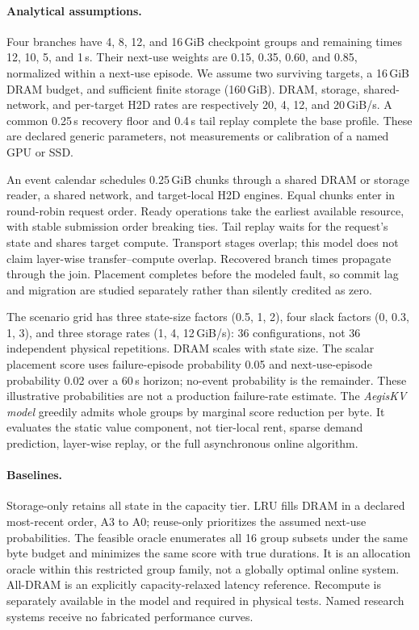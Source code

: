 \documentclass[sigplan,10pt,anonymous,nonacm]{acmart}
\begin{document}
\paragraph{Analytical assumptions.}
Four branches have 4, 8, 12, and 16\,GiB checkpoint groups and remaining
times 12, 10, 5, and 1\,s. Their next-use weights are 0.15, 0.35, 0.60,
and 0.85, normalized within a next-use episode. We assume two surviving
targets, a 16\,GiB DRAM budget, and sufficient finite storage (160\,GiB).
DRAM, storage, shared-network, and per-target H2D rates are respectively
20, 4, 12, and 20\,GiB/s. A common 0.25\,s recovery floor and 0.4\,s tail
replay complete the base profile. These are declared generic parameters,
not measurements or calibration of a named GPU or SSD.

An event calendar schedules 0.25\,GiB chunks through a shared DRAM or
storage reader, a shared network, and target-local H2D engines. Equal
chunks enter in round-robin request order. Ready operations take the
earliest available resource, with stable submission order breaking ties.
Tail replay waits for the request's state and shares target compute.
Transport stages overlap; this model does not claim layer-wise
transfer--compute overlap. Recovered branch times propagate through the
join. Placement completes before the modeled fault, so commit lag and
migration are studied separately rather than silently credited as zero.

The scenario grid has three state-size factors (0.5, 1, 2), four slack
factors (0, 0.3, 1, 3), and three storage rates (1, 4, 12\,GiB/s): 36
configurations, not 36 independent physical repetitions. DRAM scales with
state size. The scalar placement score uses failure-episode probability
0.05 and next-use-episode probability 0.02 over a 60\,s horizon; no-event
probability is the remainder. These illustrative probabilities are not a
production failure-rate estimate. The \emph{AegisKV model} greedily admits
whole groups by marginal score reduction per byte. It evaluates the
static value component, not tier-local rent, sparse demand prediction,
layer-wise replay, or the full asynchronous online algorithm.

\paragraph{Baselines.}
Storage-only retains all state in the capacity tier. LRU fills DRAM in
a declared most-recent order, A3 to A0; reuse-only prioritizes the assumed
next-use probabilities. The feasible oracle enumerates all 16 group
subsets under the same byte budget and minimizes the same score with true
durations. It is an allocation oracle within this restricted group family,
not a globally optimal online system. All-DRAM is an explicitly
capacity-relaxed latency reference. Recompute is separately available in
the model and required in physical tests. Named research systems receive
no fabricated performance curves.
\end{document}
